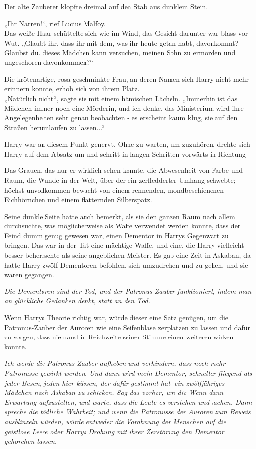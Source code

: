 {Der alte Zauberer klopfte dreimal auf den Stab aus dunklem Stein.

„Ihr Narren!“, rief Lucius Malfoy.\\ Das weiße Haar schüttelte sich wie im Wind, das Gesicht darunter war blass vor Wut. „Glaubt ihr, dass ihr mit dem, was ihr heute getan habt, davonkommt? Glaubst du, dieses Mädchen kann versuchen, meinen Sohn zu ermorden und ungeschoren davonkommen?“

Die krötenartige, rosa geschminkte Frau, an deren Namen sich Harry nicht mehr erinnern konnte, erhob sich von ihrem Platz.\\ „Natürlich nicht“, sagte sie mit einem hämischen Lächeln. „Immerhin ist das Mädchen immer noch eine Mörderin, und ich denke, das Ministerium wird ihre Angelegenheiten sehr genau beobachten - es erscheint kaum klug, sie auf den Straßen herumlaufen zu lassen...“

Harry war an diesem Punkt genervt. Ohne zu warten, um zuzuhören, drehte sich Harry auf dem Absatz um und schritt in langen Schritten vorwärts in Richtung -

Das Grauen, das nur er wirklich sehen konnte, die Abwesenheit von Farbe und Raum, die Wunde in der Welt, über der ein zerfledderter Umhang schwebte; höchst unvollkommen bewacht von einem rennenden, mondbeschienenen Eichhörnchen und einem flatternden Silberspatz.

Seine dunkle Seite hatte auch bemerkt, als sie den ganzen Raum nach allem durchsuchte, was möglicherweise als Waffe verwendet werden konnte, dass der Feind dumm genug gewesen war, einen Dementor in Harrys Gegenwart zu bringen. Das war in der Tat eine mächtige Waffe, und eine, die Harry vielleicht besser beherrschte als seine angeblichen Meister. Es gab eine Zeit in Askaban, da hatte Harry zwölf Dementoren befohlen, sich umzudrehen und zu gehen, und sie waren gegangen.

\emph{Die Dementoren sind der Tod, und der Patronus-Zauber funktioniert, indem man an glückliche Gedanken denkt, statt an den Tod.}

Wenn Harrys Theorie richtig war, würde dieser eine Satz genügen, um die Patronus-Zauber der Auroren wie eine Seifenblase zerplatzen zu lassen und dafür zu sorgen, dass niemand in Reichweite seiner Stimme einen weiteren wirken konnte.

\emph{Ich werde die Patronus-Zauber aufheben und verhindern, dass noch mehr Patronusse gewirkt werden. Und dann wird mein Dementor, schneller fliegend als jeder Besen,} \emph{jeden hier küssen, der dafür gestimmt hat, ein zwölfjähriges Mädchen nach Askaban zu schicken. Sag das vorher, um die Wenn-dann-Erwartung aufzustellen, und warte, dass die Leute es verstehen und lachen. Dann spreche die tödliche Wahrheit; und wenn die Patronusse der Auroren zum Beweis ausblinzeln würden, würde entweder die Vorahnung der Menschen auf die geistlose Leere oder Harrys Drohung mit ihrer Zerstörung den Dementor gehorchen lassen.}

}
